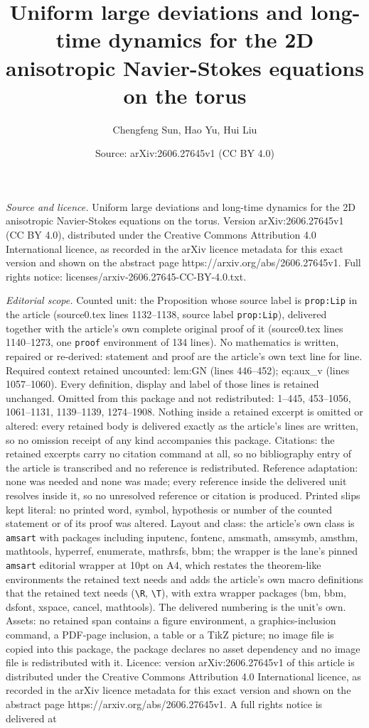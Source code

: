 \documentclass[10pt,a4paper]{amsart}
\title[Uniform large deviations and long-time dynamics for the 2D a]{Uniform large deviations and long-time dynamics for the 2D anisotropic Navier-Stokes equations on the torus}
\author{Chengfeng Sun, Hao Yu, Hui Liu}
\date{Source: arXiv:2606.27645v1 (CC BY 4.0)}
\begin{document}
\maketitle

\noindent\emph{Source and licence.} Uniform large deviations and long-time dynamics for the 2D anisotropic Navier-Stokes equations on the torus. Version arXiv:2606.27645v1 (CC BY 4.0), distributed under the Creative Commons Attribution 4.0 International licence, as recorded in the arXiv licence metadata for this exact version and shown on the abstract page https://arxiv.org/abs/2606.27645v1. Full rights notice: licenses/arxiv-2606.27645-CC-BY-4.0.txt.\par\smallskip

\noindent\textit{Editorial scope.} Counted unit: the Proposition whose source label is \texttt{prop:Lip} in the article (source0.tex lines 1132--1138, source label \texttt{prop:Lip}), delivered together with the article's own complete original proof of it (source0.tex lines 1140--1273, one \texttt{proof} environment of 134 lines). No mathematics is written, repaired or re-derived: statement and proof are the article's own text line for line. Required context retained uncounted: lem:GN (lines 446--452); eq:aux\_v (lines 1057--1060). Every definition, display and label of those lines is retained unchanged. Omitted from this package and not redistributed: 1--445, 453--1056, 1061--1131, 1139--1139, 1274--1908. Nothing inside a retained excerpt is omitted or altered: every retained body is delivered exactly as the article's lines are written, so no omission receipt of any kind accompanies this package. Citations: the retained excerpts carry no citation command at all, so no bibliography entry of the article is transcribed and no reference is redistributed. Reference adaptation: none was needed and none was made; every reference inside the delivered unit resolves inside it, so no unresolved reference or citation is produced. Printed slips kept literal: no printed word, symbol, hypothesis or number of the counted statement or of its proof was altered. Layout and class: the article's own class is \texttt{amsart} with packages including inputenc, fontenc, amsmath, amssymb, amsthm, mathtools, hyperref, enumerate, mathrsfs, bbm; the wrapper is the lane's pinned \texttt{amsart} editorial wrapper at 10pt on A4, which restates the theorem-like environments the retained text needs and adds the article's own macro definitions that the retained text needs (\texttt{\textbackslash R}, \texttt{\textbackslash T}), with extra wrapper packages (bm, bbm, dsfont, xspace, cancel, mathtools). The delivered numbering is the unit's own. Assets: no retained span contains a figure environment, a graphics-inclusion command, a PDF-page inclusion, a table or a TikZ picture; no image file is copied into this package, the package declares no asset dependency and no image file is redistributed with it. Licence: version arXiv:2606.27645v1 of this article is distributed under the Creative Commons Attribution 4.0 International licence, as recorded in the arXiv licence metadata for this exact version and shown on the abstract page https://arxiv.org/abs/2606.27645v1. A full rights notice is delivered at 
\end{document}
